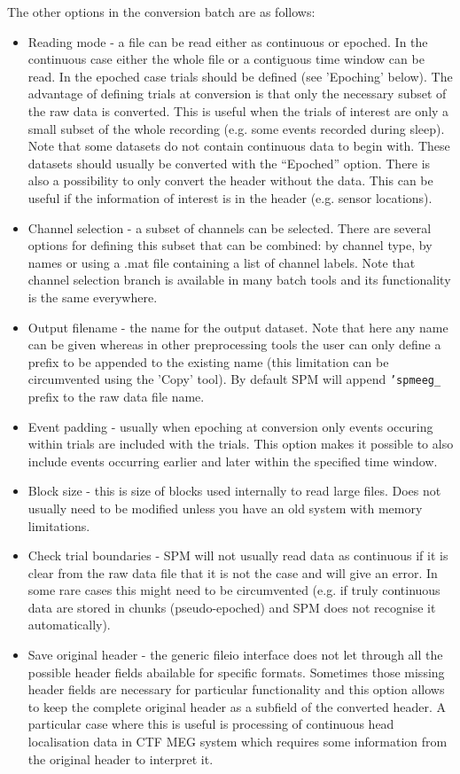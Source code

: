 The other options in the conversion batch are as follows:
\begin{itemize}
\item Reading mode - a file can be read either as continuous or epoched. In the continuous case either the whole file or a contiguous time window can be read. In the epoched case trials should be defined (see 'Epoching' below).  The advantage of defining trials at conversion is that only the necessary subset of the raw data is converted. This is useful when the trials of interest are only a small subset of the whole recording (e.g. some events recorded during sleep). Note that some datasets do not contain continuous data to begin with. These datasets should usually be converted with the ``Epoched'' option. There is also a possibility to only convert the header without the data. This can be useful if the information of interest is in the header (e.g. sensor locations).
\item Channel selection - a subset of channels can be selected. There are several options for defining this subset that can be combined:  by channel type, by names or using a .mat file containing a list of channel labels. Note that channel selection branch is available in many batch tools and its functionality is the same everywhere. 
\item Output filename - the name for the output dataset. Note that here any name can be given whereas in other preprocessing tools the user can only define a prefix to be appended to the existing name (this limitation can be circumvented using the 'Copy' tool). By default SPM will append \texttt{'spmeeg\_} prefix to the raw data file name.
\item Event padding - usually when epoching at conversion only events occuring within trials are included with the trials. This option makes it possible to also include events occurring earlier and later within the specified time window.
\item Block size - this is size of blocks used internally to read large files. Does not usually need to be modified unless you have an old system with memory limitations. 
\item Check trial boundaries - SPM will not usually read data as continuous if it is clear from the raw data file that it is not the case and will give an error. In some rare cases this might need to be circumvented (e.g. if truly continuous data are stored in chunks (pseudo-epoched) and SPM does not recognise it automatically). 
\item Save original header - the generic fileio interface does not let through all the possible header fields abailable for specific formats. Sometimes those missing header fields are necessary for particular functionality and this option allows to keep the complete original header as a subfield of the converted header. A particular case where this is useful is processing  of continuous head localisation data in CTF MEG system which requires some information from the original header to interpret it.

\end{itemize}
